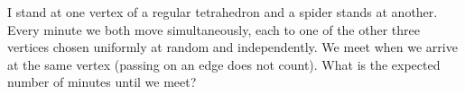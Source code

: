 I stand at one vertex of a regular tetrahedron and a spider stands at another. Every minute we both move simultaneously, each to one of the other three vertices chosen uniformly at random and independently. We meet when we arrive at the same vertex (passing on an edge does not count). What is the expected number of minutes until we meet?
